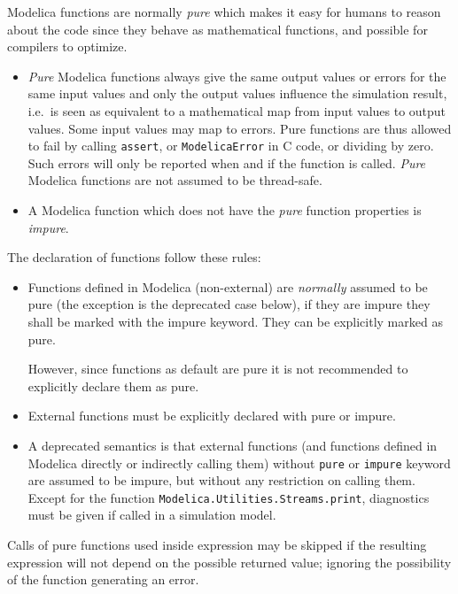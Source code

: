 Modelica functions are normally \emph{pure} which makes it easy for
humans to reason about the code since they behave as mathematical
functions, and possible for compilers to optimize.

\begin{itemize}
\item
  \emph{Pure} Modelica functions always give the same output values or
  errors for the same input values and only the output values influence
  the simulation result, i.e.\ is seen as equivalent to a mathematical
  map from input values to output values. Some input values may map to
  errors. Pure functions are thus allowed to fail by calling \lstinline!assert!, or
  \lstinline[language=C]!ModelicaError! in C code, or dividing by zero. Such errors will only be
  reported when and if the function is called.  \emph{Pure} Modelica
  functions are not assumed to be thread-safe.
\item
  A Modelica function which does not have the \emph{pure} function
  properties is \emph{impure}.
\end{itemize}

The declaration of functions follow these rules:
\begin{itemize}
\item
  Functions defined in Modelica (non-external) are \emph{normally}
  assumed to be pure (the exception is the deprecated case below), if
  they are impure they shall be marked with the impure keyword. They can
  be explicitly marked as pure.
  \begin{nonnormative}
  However, since functions as default are pure it is not recommended to explicitly declare them as pure.
  \end{nonnormative}
\item
  External functions must be explicitly declared with pure or impure.
\item
  A deprecated semantics is that external functions (and functions defined in Modelica directly or indirectly calling them) without \lstinline!pure! or \lstinline!impure! keyword are assumed to be
  impure, but without any restriction on calling them.  Except for the function \lstinline!Modelica.Utilities.Streams.print!, diagnostics must be given if called in a simulation model.
\end{itemize}

Calls of pure functions used inside expression may be skipped if the
resulting expression will not depend on the possible returned value;
ignoring the possibility of the function generating an error.

